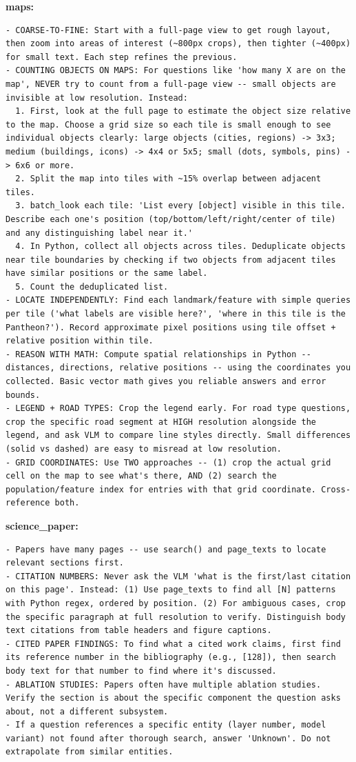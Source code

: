\documentclass[10pt,twocolumn]{article}
\begin{document}
\textbf{maps:}
\begin{lstlisting}
- COARSE-TO-FINE: Start with a full-page view to get rough layout, then zoom into areas of interest (~800px crops), then tighter (~400px) for small text. Each step refines the previous.
- COUNTING OBJECTS ON MAPS: For questions like 'how many X are on the map', NEVER try to count from a full-page view -- small objects are invisible at low resolution. Instead:
  1. First, look at the full page to estimate the object size relative to the map. Choose a grid size so each tile is small enough to see individual objects clearly: large objects (cities, regions) -> 3x3; medium (buildings, icons) -> 4x4 or 5x5; small (dots, symbols, pins) -> 6x6 or more.
  2. Split the map into tiles with ~15% overlap between adjacent tiles.
  3. batch_look each tile: 'List every [object] visible in this tile. Describe each one's position (top/bottom/left/right/center of tile) and any distinguishing label near it.'
  4. In Python, collect all objects across tiles. Deduplicate objects near tile boundaries by checking if two objects from adjacent tiles have similar positions or the same label.
  5. Count the deduplicated list.
- LOCATE INDEPENDENTLY: Find each landmark/feature with simple queries per tile ('what labels are visible here?', 'where in this tile is the Pantheon?'). Record approximate pixel positions using tile offset + relative position within tile.
- REASON WITH MATH: Compute spatial relationships in Python -- distances, directions, relative positions -- using the coordinates you collected. Basic vector math gives you reliable answers and error bounds.
- LEGEND + ROAD TYPES: Crop the legend early. For road type questions, crop the specific road segment at HIGH resolution alongside the legend, and ask VLM to compare line styles directly. Small differences (solid vs dashed) are easy to misread at low resolution.
- GRID COORDINATES: Use TWO approaches -- (1) crop the actual grid cell on the map to see what's there, AND (2) search the population/feature index for entries with that grid coordinate. Cross-reference both.
\end{lstlisting}

\textbf{science\_paper:}
\begin{lstlisting}
- Papers have many pages -- use search() and page_texts to locate relevant sections first.
- CITATION NUMBERS: Never ask the VLM 'what is the first/last citation on this page'. Instead: (1) Use page_texts to find all [N] patterns with Python regex, ordered by position. (2) For ambiguous cases, crop the specific paragraph at full resolution to verify. Distinguish body text citations from table headers and figure captions.
- CITED PAPER FINDINGS: To find what a cited work claims, first find its reference number in the bibliography (e.g., [128]), then search body text for that number to find where it's discussed.
- ABLATION STUDIES: Papers often have multiple ablation studies. Verify the section is about the specific component the question asks about, not a different subsystem.
- If a question references a specific entity (layer number, model variant) not found after thorough search, answer 'Unknown'. Do not extrapolate from similar entities.
\end{lstlisting}
\end{document}
